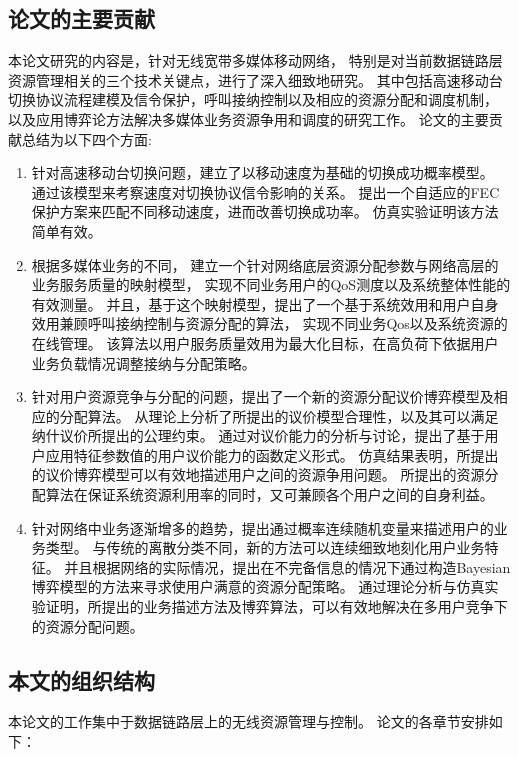\subsection{论文的主要贡献}
本论文研究的内容是，针对无线宽带多媒体移动网络，
特别是对当前数据链路层资源管理相关的三个技术关键点，进行了深入细致地研究。
其中包括高速移动台切换协议流程建模及信令保护，呼叫接纳控制以及相应的资源分配和调度机制，
以及应用博弈论方法解决多媒体业务资源争用和调度的研究工作。
论文的主要贡献总结为以下四个方面:
\begin{enumerate}[(1.)]
\item 
针对高速移动台切换问题，建立了以移动速度为基础的切换成功概率模型。
通过该模型来考察速度对切换协议信令影响的关系。
提出一个自适应的FEC保护方案来匹配不同移动速度，进而改善切换成功率。
仿真实验证明该方法简单有效。

\item 
根据多媒体业务的不同，
建立一个针对网络底层资源分配参数与网络高层的业务服务质量的映射模型，
实现不同业务用户的QoS测度以及系统整体性能的有效测量。
并且，基于这个映射模型，提出了一个基于系统效用和用户自身效用兼顾呼叫接纳控制与资源分配的算法，
实现不同业务Qos以及系统资源的在线管理。
该算法以用户服务质量效用为最大化目标，在高负荷下依据用户业务负载情况调整接纳与分配策略。

\item 
针对用户资源竞争与分配的问题，提出了一个新的资源分配议价博弈模型及相应的分配算法。
从理论上分析了所提出的议价模型合理性，以及其可以满足纳什议价所提出的公理约束。
通过对议价能力的分析与讨论，提出了基于用户应用特征参数值的用户议价能力的函数定义形式。
仿真结果表明，所提出的议价博弈模型可以有效地描述用户之间的资源争用问题。
所提出的资源分配算法在保证系统资源利用率的同时，又可兼顾各个用户之间的自身利益。

\item 
针对网络中业务逐渐增多的趋势，提出通过概率连续随机变量来描述用户的业务类型。
与传统的离散分类不同，新的方法可以连续细致地刻化用户业务特征。
并且根据网络的实际情况，提出在不完备信息的情况下通过构造Bayesian博弈模型的方法来寻求使用户满意的资源分配策略。
通过理论分析与仿真实验证明，所提出的业务描述方法及博弈算法，可以有效地解决在多用户竞争下的资源分配问题。
\end{enumerate}

\subsection{本文的组织结构}
本论文的工作集中于数据链路层上的无线资源管理与控制。
论文的各章节安排如下：

